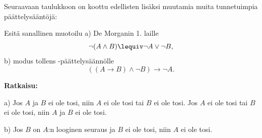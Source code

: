 Seuraavaan taulukkoon on koottu edellisten lisäksi muutamia muita tunnetuimpia päättelysääntöjä: %

\bigskip


\bigskip

\begin{esimerkki}
Esitä  sanallinen muotoilu a) De Morganin 1. laille
\[
\lnot (A\land B) \lequiv \lnot A \lor \lnot B,
\]
b) modus tollens -päättelysäännölle
\[
((A\to B)\land \lnot B) \to \lnot A.
\]

{\bf Ratkaisu:}

a) Jos $A$ ja $B$ ei ole tosi, niin $A$ ei ole tosi tai $B$ ei ole tosi. Jos $A$ ei ole tosi tai $B$ ei ole tosi, niin $A$ ja $B$ ei ole tosi.

b) Jos $B$ on $A$:n looginen seuraus ja $B$ ei ole tosi, niin $A$ ei ole tosi.
\end{esimerkki}


